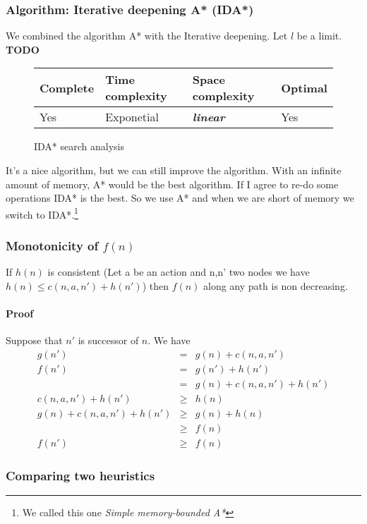 \subsubsection{Algorithm: Iterative deepening A* (IDA*)}

We combined the algorithm A* with the Iterative deepening. Let $l$ be a limit. \textbf{TODO}

\begin{figure}[H]
\centering
\begin{tabular}{|llll|}
\hline
\textbf{Complete} & \textbf{Time complexity} & \textbf{Space complexity} & \textbf{Optimal} \\
\hline
Yes & Exponetial & \textbf{\textit{linear}} & Yes\\
\hline
\end{tabular}
\caption{IDA* search analysis}
\end{figure}

It's a nice algorithm, but we can still improve the algorithm. With an infinite amount of memory, A* would be the best algorithm. If I agree to re-do some operations IDA* is the best. So we use A* and when we are short of memory we switch to IDA*.\footnote{We called this one \textit{Simple memory-bounded A*}}

\subsubsection{Monotonicity of $f(n)$}

If $h(n)$ is consistent (Let a be an action and n,n' two nodes we have $h(n) \leq c(n,a,n') + h(n')$) then $f(n)$ along any path is non decreasing.

\paragraph{Proof}

Suppose that $n'$ is successor of $n$. We have
\begin{eqnarray*}
g(n') &=& g(n) + c(n,a,n')\\
f(n') &=& g(n') + h(n')\\
&=& g(n) + c(n,a,n') + h(n')\\
c(n,a,n') +h(n') &\geq& h(n)\\
g(n) + c(n,a,n') + h(n') &\geq& g(n) + h(n)\\
&\geq& f(n) \\
f(n') &\geq& f(n)
\end{eqnarray*}

\subsubsection{Comparing two heuristics}

